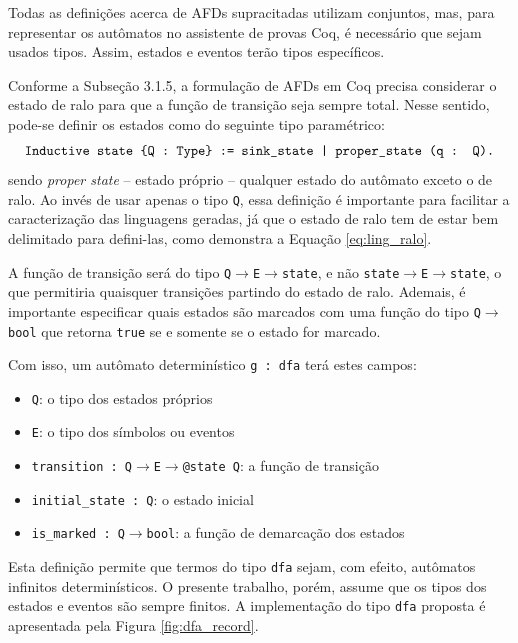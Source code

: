 Todas as definições acerca de AFDs supracitadas utilizam conjuntos, mas, para representar os autômatos no assistente de provas Coq, é necessário que sejam usados tipos. Assim, estados e eventos terão tipos específicos.

Conforme a Subseção 3.1.5, a formulação de AFDs em Coq precisa considerar o estado de ralo para que a função de transição seja sempre total. Nesse sentido, pode-se definir os estados como do seguinte tipo paramétrico: $$\text{\texttt{Inductive state \{Q : Type\} := sink\_state | proper\_state (q : Q).}}$$ sendo \textit{proper state} -- estado próprio -- qualquer estado do autômato exceto o de ralo. Ao invés de usar apenas o tipo \texttt{Q}, essa definição é importante para facilitar a caracterização das linguagens geradas, já que o estado de ralo tem de estar bem delimitado para defini-las, como demonstra a Equação \ref{eq:ling_ralo}.

A função de transição será do tipo \texttt{Q$\to$E$\to$state}, e não \texttt{state$\to$E$\to$state}, o que permitiria quaisquer transições partindo do estado de ralo. Ademais, é importante especificar quais estados são marcados com uma função do tipo \texttt{Q$\to$bool} que retorna \texttt{true} se e somente se o estado for marcado.

Com isso, um autômato determinístico \texttt{g : dfa} terá estes campos: \begin{itemize}
	\item \texttt{Q}: o tipo dos estados próprios
	\item \texttt{E}: o tipo dos símbolos ou eventos
	\item  \texttt{transition : Q$\to$E$\to$@state Q}: a função de transição
	\item \texttt{initial\_state : Q}: o estado inicial
	\item \texttt{is\_marked : Q$\to$bool}: a função de demarcação dos estados
\end{itemize}

Esta definição permite que termos do tipo \texttt{dfa} sejam, com efeito, autômatos infinitos determinísticos. O presente trabalho, porém, assume que os tipos dos estados e eventos são sempre finitos. A implementação do tipo \texttt{dfa} proposta é apresentada pela Figura \ref{fig:dfa_record}.


